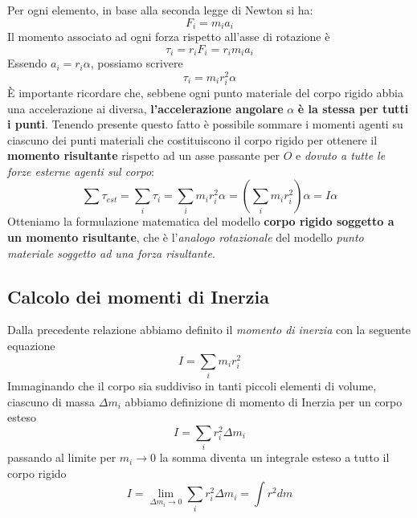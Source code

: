 \documentclass[a4paper,11pt,oneside]{book}
\begin{document}
Per ogni elemento, in base alla seconda legge di Newton si ha:
\begin{equation*}
    F_i = m_i a_i
\end{equation*}
Il momento associato ad ogni forza rispetto all'asse di rotazione è
\begin{equation*}
    \tau_i = r_i F_i = r_i m_i a_i 
\end{equation*} 
Essendo $a_i = r_i\alpha$, possiamo scrivere 
\begin{equation*}
    \tau_i = m_i r_i^2 \alpha
\end{equation*}
È importante ricordare che, sebbene ogni punto materiale del corpo rigido abbia una accelerazione ai diversa, \textbf{l’accelerazione 
angolare} \textbf{$\alpha$} \textbf{è la stessa per tutti i punti}.
Tenendo presente questo fatto è possibile sommare i momenti agenti su ciascuno dei punti materiali che costituiscono il corpo rigido 
per ottenere il \textbf{momento risultante} rispetto ad un asse passante per $O$ e \emph{dovuto a tutte le forze esterne agenti sul corpo}:
\begin{equation*}
    \sum \tau_{est} = \sum_i \tau_i = \sum_i m_ir_i^2\alpha = \left( \sum_i m_ir_i^2 \right) \alpha = I\alpha
\end{equation*}
Otteniamo la formulazione matematica del modello \textbf{corpo rigido soggetto a un momento risultante}, che è l'\emph{analogo rotazionale} del modello 
\emph{punto materiale soggetto ad una forza risultante}.

\subsection{Calcolo dei momenti di Inerzia}
Dalla precedente relazione abbiamo definito il \emph{momento di inerzia} con la seguente equazione
\begin{equation*}
    I = \sum_i m_ir_i^2
\end{equation*}
Immaginando che il corpo sia suddiviso in tanti piccoli elementi di volume, ciascuno di massa $\Delta m_i$ abbiamo
definizione di momento di Inerzia per un corpo esteso
\begin{equation*}
    I = \sum_i r_i^2 \Delta m_i    
\end{equation*}
passando al limite per $m_i \to 0$ la somma diventa un integrale esteso a tutto il corpo rigido
\begin{equation*}
    I = \lim_{\Delta m_i \to 0} \sum_i r_i^2 \Delta m_i = \int r^2 dm
\end{equation*}
\end{document}
